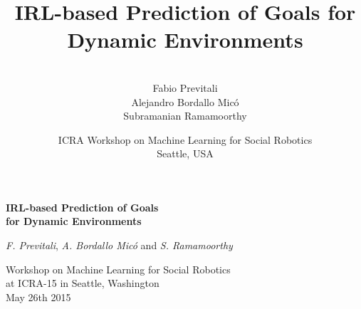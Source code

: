 \documentclass{beamer}
\title[IRL-based Prediction of Goals for Dynamic Environments]{\huge IRL-based Prediction of Goals for Dynamic Environments}
\subtitle{}
\author[Fabio Previtali]{\vspace{0.1cm} \\ \large Fabio Previtali \\ Alejandro Bordallo Mic\'o \\ Subramanian Ramamoorthy}
\date[May 26th 2015]{\small ICRA Workshop on Machine Learning for Social Robotics\\Seattle, USA}
\begin{document}
\begin{frame}[plain]
	\begin{center}
		\huge
		
		\vspace{0.5cm}
		
		\textbf{IRL-based Prediction of Goals \\ for Dynamic Environments}
		
		\vspace{0.7cm}
		
		\large
		
		\emph{F. Previtali}, \emph{A. Bordallo Mic\'o} and \emph{S.
		Ramamoorthy}
		
		\vspace{1.5cm}
		
		\normalsize
		
		Workshop on Machine Learning for Social Robotics \\
		at ICRA-15 in Seattle, Washington \\
		May 26th 2015
		
		\vspace{1.5cm}
		
	\end{center}
\end{frame}






\end{document}
